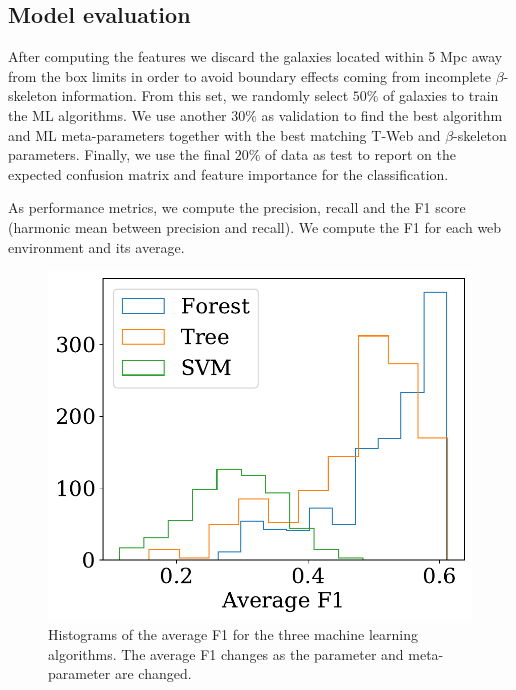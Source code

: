 \documentclass[usenatbib]{mnras}
\begin{document}
\subsection{Model evaluation}

After computing the features we discard the galaxies located within 5 Mpc
away from the box limits  in order  to avoid boundary effects coming
from incomplete $\beta$-skeleton information.  
From this set, we randomly select $50\%$ of galaxies to train the ML
algorithms.   
We use another $30\%$ as validation to find the best algorithm and ML
meta-parameters together with the best matching T-Web and
$\beta$-skeleton parameters.   
Finally, we use the final $20 \%$ of data as test to report
on the expected confusion matrix and feature importance for the
classification. 

As performance metrics, we compute the precision, recall and the F1
score (harmonic mean between precision and recall).  
We compute the F1 for each web environment and its average.


\begin{figure}
    \includegraphics[scale=0.55]{Figs/p_hist_f1.pdf}
    \caption{Histograms of the average F1 for the three machine
      learning algorithms.
      The average F1 changes as the parameter and meta-parameter
      are changed.}
    \label{fig:methods}
\end{figure}
\end{document}
